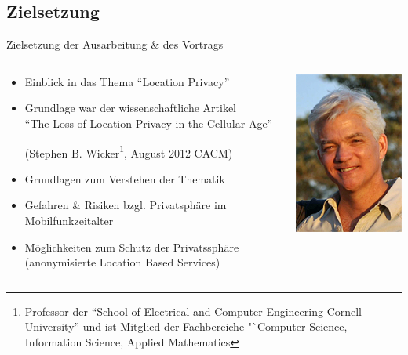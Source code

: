 \subsection{Zielsetzung}
\begin{frame}{Zielsetzung der Ausarbeitung \& des Vortrags}
\begin{columns}
  \begin{column}{.85\textwidth}
    \begin{itemize}
      \item Einblick in das Thema "`Location Privacy"'
      \item Grundlage war der wissenschaftliche Artikel\\ \vspace{.2cm}
      "`The Loss of Location Privacy in the Cellular Age"'\\
      \begin{small}
      (Stephen B. Wicker\footnote[frame]{Professor der "`School of Electrical and Computer Engineering Cornell University"' und ist Mitglied der Fachbereiche "`Computer Science, Information Science, Applied Mathematics}, August 2012 CACM)
      \end{small} \vspace{.2cm}
      \item Grundlagen zum Verstehen der Thematik
      \item Gefahren \& Risiken bzgl. Privatsphäre im Mobilfunkzeitalter
      \item Möglichkeiten zum Schutz der Privatssphäre\\
      (anonymisierte Location Based Services)
    \end{itemize}
  \end{column}
  \begin{column}{.15\textwidth}
    \begin{center}
      \includegraphics[scale=.3]{images/Stephen-Wicker.jpg}
    \end{center}
  \end{column}
\end{columns}
\end{frame}

